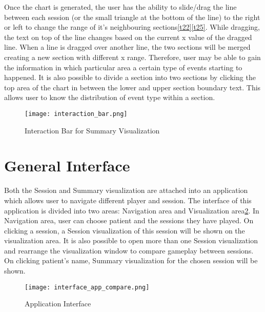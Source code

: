 Once the chart is generated, the user has the ability to slide/drag the line between each session (or the small triangle at the bottom of the line) to the right or left to change the range of it's neighbouring sections\ref{t22}\ref{t25}. While dragging, the text on top of the line changes based on the current x value of the dragged line. When a line is dragged over another line, the two sections will be merged creating a new section with different x range. Therefore, user may be able to gain the information in which particular area a certain type of events starting to happened. It is also possible to divide a section into two sections by clicking the top area of the chart in between the lower and upper section boundary text. This allows user to know the distribution of event type within a section.

\begin{figure}
\centering
\texttt{[image: interaction\_bar.png]}
\caption{Interaction Bar for Summary Visualization}
\label{fig:interaction_bar}
\end{figure}
\section{General Interface}
Both the Session and Summary visualization are attached into an application which allows user to navigate different player and session. The interface of this application is divided into two areas: Navigation area and Visualization area\ref{fig:app_interface}. In Navigation area, user can choose patient and the sessions they have played. On clicking a session, a Session visualization of this session will be shown on the visualization area. It is also possible to open more than one Session visualization and rearrange the visualization window to compare gameplay between sessions. On clicking patient's name, Summary visualization for the chosen session will be shown.

\begin{figure}
\centering
\texttt{[image: interface\_app\_compare.png]}
\caption{Application Interface}
\label{fig:app_interface}
\end{figure}